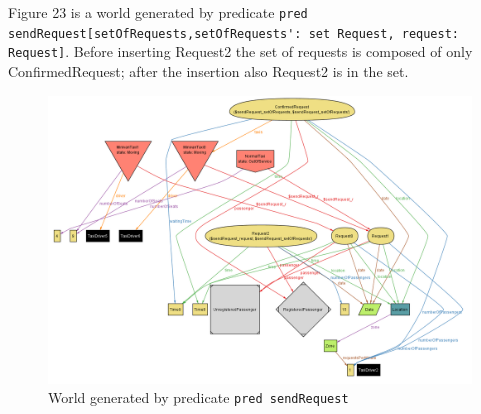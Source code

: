 \begin{landscape}

Figure 23 is a world generated by predicate \lstinline!pred sendRequest[setOfRequests,setOfRequests': set Request, request: Request]!.
Before inserting Request2 the set of requests is composed of only
ConfirmedRequest; after the insertion also Request2 is in the set.

\begin{figure}[H]
\begin{centering}
\includegraphics[scale=0.5]{alloy/instances/sendRequest}
\par\end{centering}

\protect\caption{World generated by predicate \lstinline!pred sendRequest!}
\end{figure}


\end{landscape}

\clearpage{}

